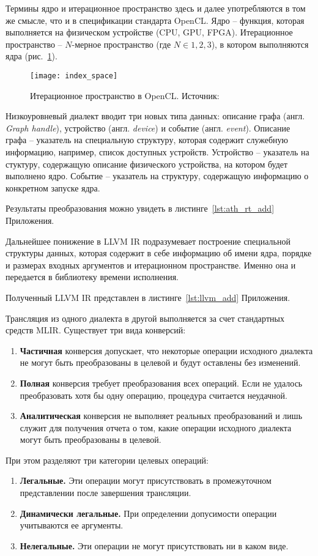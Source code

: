 Термины ядро и итерационное пространство здесь и далее употребляются в том же
смысле, что и в спецификации стандарта OpenCL. Ядро -- функция, которая
выполняется на физическом устройстве (CPU, GPU, FPGA). Итерационное пространство
-- $N$-мерное пространство (где $N \in {1, 2, 3}$), в котором выполняются ядра
(рис.~\ref{fig:index_space}).

\begin{figure}[h]
  \centering
  \texttt{[image: index\_space]}
  \caption{Итерационное пространство в OpenCL. Источник: \cite{opencl3}}
  \label{fig:index_space}
\end{figure}

Низкоуровневый диалект вводит три новых типа данных: описание графа
(англ. \textit{Graph handle}), устройство (англ. \textit{device})
и событие (англ. \textit{event}). Описание графа -- указатель на специальную
структуру, которая содержит служебную информацию, например, список доступных
устройств. Устройство -- указатель на стуктуру, содержащую описание физического
устройства, на котором будет выполнено ядро. Событие -- указатель на структуру,
содержащую информацию о конкретном запуске ядра.

Результаты преобразования можно увидеть в листинге~\ref{lst:ath_rt_add} Приложения.

Дальнейшее понижение в LLVM IR подразумевает построение специальной структуры
данных, которая содержит в себе информацию об имени ядра, порядке и размерах
входных аргументов и итерационном пространстве. Именно она и передается
в библиотеку времени исполнения.

Полученный LLVM IR представлен в листинге~\ref{lst:llvm_add} Приложения.

Трансляция из одного диалекта в другой выполняется за счет стандартных средств
MLIR. Существует три вида конверсий:

\begin{enumerate}
  \item \textbf{Частичная} конверсия допускает, что некоторые операции исходного
  диалекта не могут быть преобразованы в целевой и будут оставлены без изменений.
  \item \textbf{Полная} конверсия требует преобразования всех операций. Если
  не удалось преобразовать хотя бы одну операцию, процедура считается неудачной.
  \item \textbf{Аналитическая} конверсия не выполняет реальных преобразований
  и лишь служит для получения отчета о том, какие операции исходного диалекта
  могут быть преобразованы в целевой.
\end{enumerate}
При этом разделяют три категории целевых операций:
\begin{enumerate}
  \item \textbf{Легальные.} Эти операции могут присутствовать в промежуточном
  представлении после завершения трансляции.
  \item \textbf{Динамически легальные.} При определении допусимости операции
  учитываются ее аргументы.
  \item \textbf{Нелегальные.} Эти операции не могут присутствовать ни в каком
  виде.
\end{enumerate}

